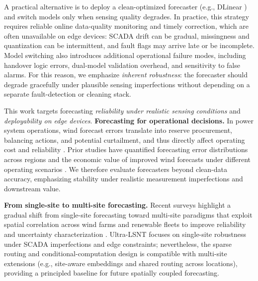 \documentclass[review,3p,times]{elsarticle}
\begin{document}
A practical alternative is to deploy a clean-optimized forecaster (e.g., DLinear \cite{zeng2023aaai}) and switch models only when sensing quality degrades. In practice, this strategy requires reliable online data-quality monitoring and timely correction, which are often unavailable on edge devices: SCADA drift can be gradual, missingness and quantization can be intermittent, and fault flags may arrive late or be incomplete. Model switching also introduces additional operational failure modes, including handover logic errors, dual-model validation overhead, and sensitivity to false alarms. For this reason, we emphasize \emph{inherent robustness}: the forecaster should degrade gracefully under plausible sensing imperfections without depending on a separate fault-detection or cleaning stack.

This work targets forecasting \emph{reliability under realistic sensing conditions} and \emph{deployability on edge devices}. \noindent\textbf{Forecasting for operational decisions.} In power system operations, wind forecast errors translate into reserve procurement, balancing actions, and potential curtailment, and thus directly affect operating cost and reliability \cite{botterud2011operational}. Prior studies have quantified forecasting error distributions across regions \cite{hodge2012winderror} and the economic value of improved wind forecasts under different operating scenarios \cite{yan2025economicvalue}. We therefore evaluate forecasters beyond clean-data accuracy, emphasizing stability under realistic measurement imperfections and downstream value.

\noindent\textbf{From single-site to multi-site forecasting.} Recent surveys highlight a gradual shift from single-site forecasting toward multi-site paradigms that exploit spatial correlation across wind farms and renewable fleets to improve reliability and uncertainty characterization \cite{verdone2025review}. Ultra-LSNT focuses on single-site robustness under SCADA imperfections and edge constraints; nevertheless, the sparse routing and conditional-computation design is compatible with multi-site extensions (e.g., site-aware embeddings and shared routing across locations), providing a principled baseline for future spatially coupled forecasting.
\end{document}
